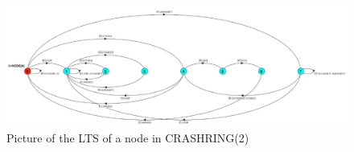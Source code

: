 \begin{figure}[!h]
  \centering
    \includegraphics[width=\textwidth]{crashring.png}
    \caption{Picture of the LTS of a node in CRASHRING(2)}
\end{figure}
